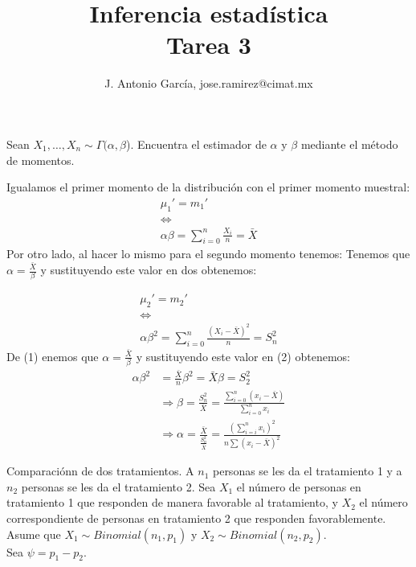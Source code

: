 \documentclass[letter]{memoir} %
\newenvironment{cframe}[1][blue]
  {\begin{tcolorbox}[colframe=#1,colback=white]}
  {\end{tcolorbox}}
\begin{document}
\title{Inferencia estadística \\
\large{Tarea 3  }}
\author{ J. Antonio García, jose.ramirez@cimat.mx}

\maketitle
\begin{enumerate}
\begin{cframe}[violet]
\item 
Sean $X_1,\dots, X_n \sim \Gamma( \alpha, \beta$). Encuentra el estimador de  $\alpha$ y $\beta$ mediante el
método de momentos. 
\end{cframe}

Igualamos el primer momento de la distribución con el primer momento muestral:
\begin{equation}
\begin{split}
\mu_1'  = m_1' \\
 \Leftrightarrow  \\
\alpha \beta =  \sum_{i=0}^n\frac{X_i}{n} = \bar{X}
\end{split}
\end{equation}
Por otro lado, al hacer lo mismo para el segundo momento tenemos:
Tenemos que $\alpha = \frac{\bar{X}}{\beta}$ y sustituyendo este valor en dos obtenemos:


\begin{equation}
\begin{split}
\mu_2'  = m_2'\\ 
 \Leftrightarrow  \\
\alpha \beta^2 =  \sum_{i=0}^n\frac{(X_i- \bar{X})^2}{n} = S_n^2
\end{split}
\end{equation}
De (1) enemos que $\alpha = \frac{\bar{X}}{\beta}$ y sustituyendo este valor en (2) obtenemos:
\[
\begin{split}
\alpha \beta ^2 & =  \frac{\bar{X}}{n}\beta^2 = \bar{X}\beta = S_2^2\\
				& \Rightarrow \beta = \frac{S_n^2}{\bar{X}} = \frac{\sum_{i=0}^n(x_i -\bar{X})}{\sum_{i=0}^nx_i} \\
                & \Rightarrow \alpha = \frac{\bar{X}}{\frac{S_n^2}{\bar{X}}} = \frac{(\sum_{i=i}^nx_i)^2}{n\sum(x_i - \bar{X})^2}
\end{split}
\]

\begin{cframe}[teal]
\item Comparaciónn de dos tratamientos. A $n_1$ personas se les da el tratamiento 1 y a $n_2$ personas se les da el tratamiento 2. Sea $X_1$ el número de personas en tratamiento 1 que responden de manera favorable al tratamiento, y $X_2$ el número correspondiente de personas en tratamiento 2 que responden favorablemente. Asume que $X_1 \sim Binomial(n_1, p_1)$ y $X_2 \sim  Binomial(n_2 ,p_2)$.\\ Sea  $\psi = p_1 - p_2$.
\end{cframe}


\end{enumerate}
\end{document}
